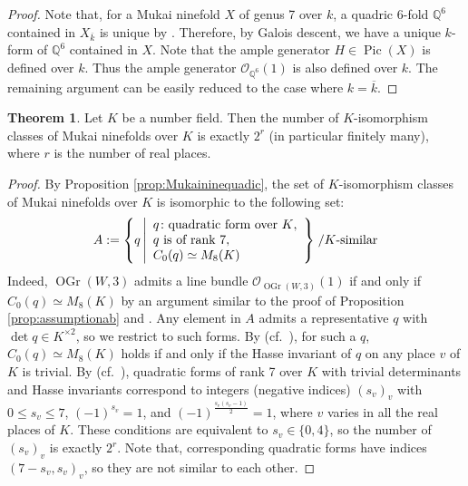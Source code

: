 \documentclass[autodetect-engine, a4paper]{amsart}
\theoremstyle{definition}
\newtheorem{thm}{Theorem}[section]
\def\Q{{\mathbb Q}}
\def\cO{\mathcal{O}}
\DeclareMathOperator\Pic{\mathrm{Pic}}
\DeclareMathOperator\OGr{\mathrm{OGr}}
\newcommand{\cred}{\color{black}}
\begin{document}
\begin{proof}
Note that, for a Mukai ninefold $X$ of genus 7 over $k$, a quadric 6-fold $\Q^6$ contained in $X_{\overline{k}}$ is unique by \cite[Lemma 5.10]{Kuznetsovspinor}.
Therefore, by Galois descent, we have a unique $k$-form of $\Q^6$ contained in $X$.
Note that the ample generator $H \in \Pic(X)$ is defined over $k$.
Thus the ample generator $\cO_{\Q^6}(1)$ is also defined over $k$. 
The remaining argument can be easily reduced to the case where $k = \overline{k}.$
\end{proof}


\begin{thm}
\label{thm:numberofmukai9}
Let $K$ be a number field.
Then the number of $K$-isomorphism classes of Mukai ninefolds over $K$ is exactly $2^r$ (in particular finitely many),
where $r$ is the number of real places.
\end{thm}

\begin{proof}
By Proposition \ref{prop:Mukaininequadic},
the set of $K$-isomorphism classes of Mukai ninefolds over $K$ is isomorphic to the following set:
\[
A:=
\left\{
q 
\left| 
\begin{array}{l}
q \colon 
\textup{quadratic form over $K$}, \\
q \textup{ is of rank $7$},\\
C_{0}(q) \simeq M_{8} (K)
\end{array}
\right\}\right.
/ K\textup{-similar}
\]
Indeed, $\OGr(W,3)$ admits a line bundle $\cO_{\OGr(W,3)} (1)$ if and only if $C_{0} (q) \simeq M_{8} (K)$ by an argument similar to the proof of Proposition \ref{prop:assumptionab} {\cred and \cite[Chapter V, Theorem 2.4]{Lam}}.
Any element in $A$ admits a representative $q$ with $\det q \in K^{\times 2}$, so we restrict to such forms.
By \cite[Chapter V, Proposition 3.20]{Lam} (cf.\ \cite[Chapter V, Theorem 2.4 and (3.12)]{Lam}),
for such a $q$, $C_{0} (q) \simeq M_{8} (K)$ holds if and only if
the Hasse invariant of $q$ on any place $v$ of $K$ is trivial.
By \cite[Theorem 72:1]{OMeara} (cf.\ \cite[Remark 66:5]{OMeara}),
quadratic forms of rank 7 over $K$ with trivial determinants and Hasse invariants correspond to integers (negative indices) $(s_{v})_{v}$ with
$0 \leq  s_{v} \leq 7$, $(-1)^{s_v} =1$, and $(-1)^{\frac{s_{v}(s_{v}-1)}{2}} =1$, where $v$ varies in all the real places of $K$.
These conditions are equivalent to $s_{v} \in \{0,4 \}$, so the number of $(s_{v})_{v}$ is exactly $2^r$.
Note that, corresponding quadratic forms have indices $(7-s_{v}, s_{v})_{v}$, so they are not similar to each other.
\end{proof}
\end{document}
